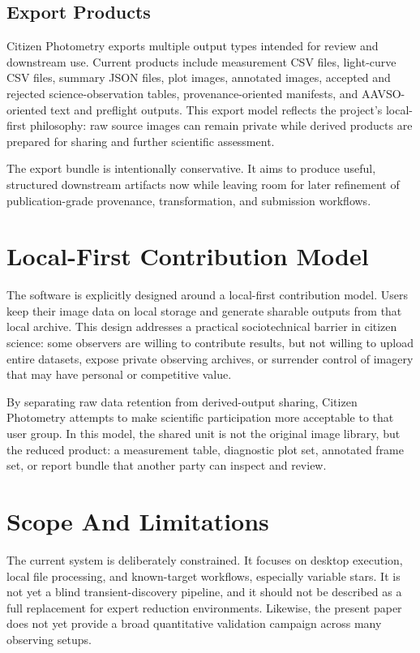 \documentclass[modern]{aastex701}
\begin{document}
\subsection{Export Products}\label{subsec:exports}

Citizen Photometry exports multiple output types intended for review and downstream use. Current products include measurement CSV files, light-curve CSV files, summary JSON files, plot images, annotated images, accepted and rejected science-observation tables, provenance-oriented manifests, and AAVSO-oriented text and preflight outputs. This export model reflects the project's local-first philosophy: raw source images can remain private while derived products are prepared for sharing and further scientific assessment.

The export bundle is intentionally conservative. It aims to produce useful, structured downstream artifacts now while leaving room for later refinement of publication-grade provenance, transformation, and submission workflows.

\section{Local-First Contribution Model}\label{sec:localfirst}

The software is explicitly designed around a local-first contribution model. Users keep their image data on local storage and generate sharable outputs from that local archive. This design addresses a practical sociotechnical barrier in citizen science: some observers are willing to contribute results, but not willing to upload entire datasets, expose private observing archives, or surrender control of imagery that may have personal or competitive value.

By separating raw data retention from derived-output sharing, Citizen Photometry attempts to make scientific participation more acceptable to that user group. In this model, the shared unit is not the original image library, but the reduced product: a measurement table, diagnostic plot set, annotated frame set, or report bundle that another party can inspect and review.

\section{Scope And Limitations}\label{sec:limitations}

The current system is deliberately constrained. It focuses on desktop execution, local file processing, and known-target workflows, especially variable stars. It is not yet a blind transient-discovery pipeline, and it should not be described as a full replacement for expert reduction environments. Likewise, the present paper does not yet provide a broad quantitative validation campaign across many observing setups.
\end{document}
